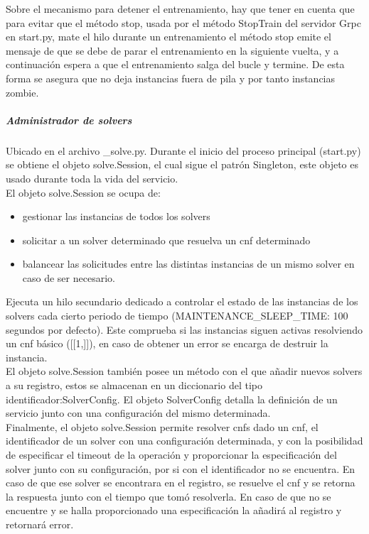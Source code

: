 \documentclass[11pt]{article}
\begin{document}
					Sobre el mecanismo para detener el entrenamiento, hay que tener en cuenta que para evitar que el método stop, usada por el método StopTrain del servidor Grpc en start.py,
					mate el hilo durante un entrenamiento el método stop emite el mensaje de que se debe de parar el entrenamiento en la siguiente vuelta,
					y a continuación espera a que el entrenamiento salga del bucle y termine. De esta forma se asegura que no deja instancias fuera de pila y por tanto instancias zombie. \\

				\subparagraph{Administrador de solvers}
					Ubicado en el archivo \_solve.py. Durante el inicio del proceso principal (start.py) se obtiene el objeto solve.Session, el cual sigue el patrón Singleton, este objeto es usado durante toda la vida del servicio. \\
					El objeto solve.Session se ocupa de:
					\begin{itemize}
						\item gestionar las instancias de todos los solvers
						\item solicitar a un solver determinado que resuelva un cnf determinado
						\item balancear las solicitudes entre las distintas instancias de un mismo solver en caso de ser necesario.
					\end{itemize}

					Ejecuta un hilo secundario dedicado a controlar el estado de las instancias de los solvers cada cierto periodo de tiempo (MAINTENANCE\_SLEEP\_TIME: 100 segundos por defecto). 
					Este comprueba si las instancias siguen activas resolviendo un cnf básico ([[1,]]), en caso de obtener un error se encarga de destruir la instancia. \\

					El objeto solve.Session también posee un método con el que añadir nuevos solvers a su registro, estos se almacenan en un diccionario del tipo identificador:SolverConfig. El objeto SolverConfig detalla
					la definición de un servicio junto con una configuración del mismo determinada. \\

					Finalmente, el objeto solve.Session permite resolver cnfs dado un cnf, el identificador de un solver con una configuración determinada, y con la posibilidad de especificar el timeout de la operación y 
					proporcionar la especificación del solver junto con su configuración, por si con el identificador no se encuentra. En caso de que ese solver se encontrara en el registro, se resuelve el cnf y se retorna
					la respuesta junto con el tiempo que tomó resolverla. En caso de que no se encuentre y se halla proporcionado una especificación la añadirá al registro y retornará error. \\
				
\end{document}
